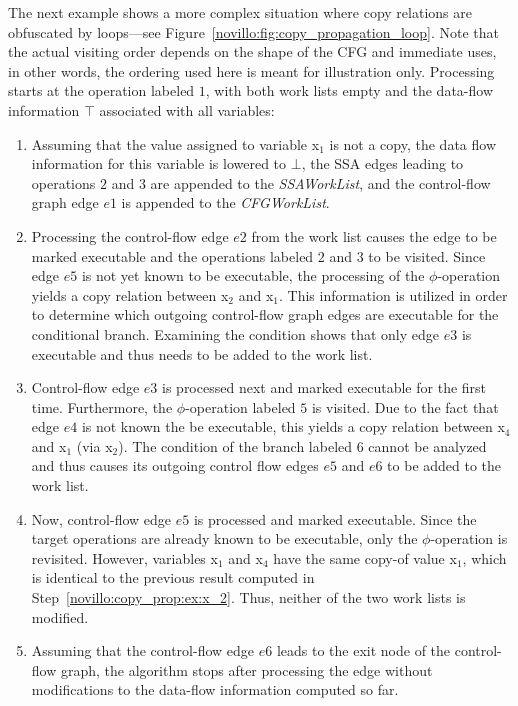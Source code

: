 The next example shows a more complex situation where copy relations are
obfuscated by loops---see Figure~\ref{novillo:fig:copy_propagation_loop}.  Note
that the actual visiting order depends on the shape of the CFG and immediate
uses, in other words, the ordering used here is meant for illustration only.
Processing starts
at the operation labeled $1$, with both work lists empty and the data-flow
information $\top$ associated with all variables:

\begin{enumerate}
\item Assuming that the value assigned to variable x$_1$ is not a copy, the data
      flow information for this variable is lowered to $\bot$, the SSA edges
      leading to operations $2$ and $3$ are appended to the \emph{SSAWorkList},
      and the control-flow graph edge $e1$ is appended to the \emph{CFGWorkList}.
\item \label{novillo:copy_prop:ex:x_2} Processing the control-flow edge $e2$ from the
      work list causes the edge to be marked executable and the operations
      labeled $2$ and $3$ to be visited. Since edge $e5$ is not yet known to be
      executable, the processing of the $\phi$-operation yields a copy relation
      between x$_2$ and x$_1$. This information is utilized in order to
      determine which outgoing control-flow graph edges are executable for the
      conditional branch. Examining the condition shows that only edge $e3$ is
      executable and thus needs to be added to the work list.
\item Control-flow edge $e3$ is processed next and marked executable for the
      first time.
      Furthermore, the $\phi$-operation labeled $5$ is visited. Due to the fact
      that edge $e4$ is not known the be executable, this yields a
      copy relation between x$_4$ and x$_1$ (via x$_2$). The condition of the
      branch labeled $6$ cannot be analyzed and thus causes its outgoing control
      flow edges $e5$ and $e6$ to be added to the work list.
\item Now, control-flow edge $e5$ is processed and marked executable. Since the
      target
      operations are already known to be executable, only the $\phi$-operation
      is revisited. However, variables x$_1$ and x$_4$ have the same copy-of
      value x$_1$, which is identical to the previous result computed in
      Step~\ref{novillo:copy_prop:ex:x_2}. Thus, neither of the two work lists
      is modified.
\item Assuming that the control-flow edge $e6$ leads to the exit node of the
      control-flow graph,
      the algorithm stops after processing the edge without modifications to
      the data-flow information computed so far.
\end{enumerate}


